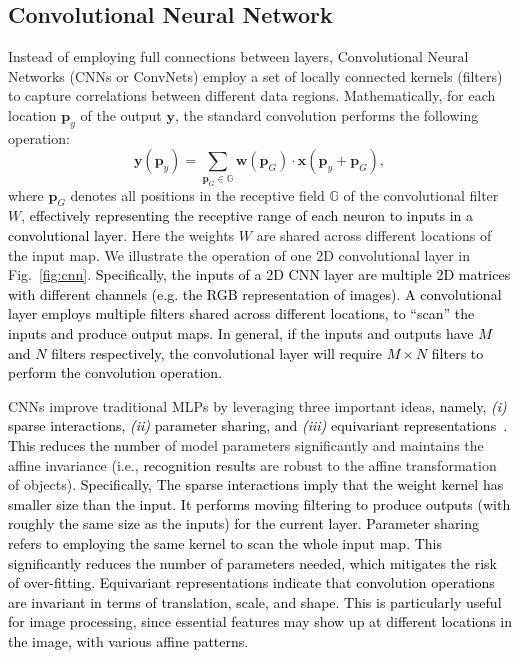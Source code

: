 \documentclass[journal,comsoc,letter]{IEEEtran}
\newcommand{\edit}[1]{\textcolor{black}{#1}}
\newcommand{\rev}[1]{\textcolor{black}{#1}}
\begin{document}
\subsection{Convolutional Neural Network}
Instead of employing full connections between layers, Convolutional Neural Networks (CNNs or ConvNets) employ a set of locally connected kernels (filters) to capture correlations between different data regions. Mathematically, for each location $\boldsymbol{p}_{y}$ of the output $\mathbf{y}$, the standard convolution performs the following operation:
\begin{equation}\label{eq:conv}
    \mathbf{y}(\boldsymbol{p}_y) = \sum_{\boldsymbol{p}_G \in \mathbb{G}} \mathbf{w}(\boldsymbol{p}_G)\cdot \mathbf{x}(\boldsymbol{p}_y + \boldsymbol{p}_G),
\end{equation}
where $\boldsymbol{p}_G$ denotes all positions in the receptive field $\mathbb{G}$ of the convolutional filter $W$, \rev{effectively representing the receptive range of each neuron to inputs in a convolutional layer}. Here the weights $W$ are shared across different locations of the input map. We illustrate the operation of one 2D convolutional layer in Fig.~\ref{fig:cnn}. \rev{Specifically, the inputs of a 2D CNN layer are multiple 2D matrices with different channels (e.g. the RGB representation of images). A convolutional layer employs multiple filters shared across different locations, to ``scan'' the inputs and produce output maps. In general, if the inputs and outputs have $M$ and $N$ filters respectively, the convolutional layer will require $M\times N$ filters to perform the convolution operation.}

CNNs improve traditional MLPs by leveraging three important ideas, \edit{namely, \emph{(i)} sparse interactions, \emph{(ii)} parameter sharing, and \emph{(iii)} equivariant representations~\cite{goodfellow2016deep}. This reduces the number} of model parameters significantly and maintains the affine invariance (i.e., \rev{recognition results} are robust to the affine transformation of objects). 
\edit{
Specifically, The sparse interactions imply that the weight kernel has smaller size than the input. It performs moving filtering to produce outputs (with roughly the same size as the inputs) for the current layer. Parameter sharing refers to employing the same kernel to scan the whole input map. This significantly reduces the number of parameters needed, which mitigates the risk of over-fitting. Equivariant representations indicate that convolution operations are invariant in terms of translation, scale, and shape. This is particularly useful for image processing, since essential features may show up at different locations in the image, with various affine patterns. }
\end{document}
